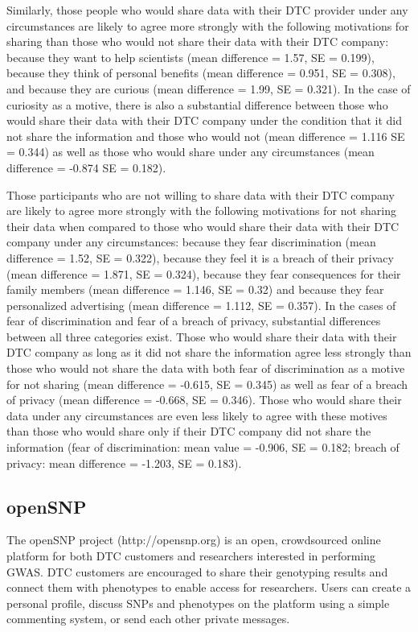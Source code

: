 \documentclass[10pt]{article}
\begin{document}
Similarly, those people who would share data with their DTC provider under any circumstances are likely to agree more strongly with 
the following motivations for sharing than those who would not share their data with their DTC company: because they want to help 
scientists (mean difference = 1.57, SE = 0.199), because they think of personal benefits (mean difference = 0.951, SE = 0.308), 
and because they are curious (mean difference = 1.99, SE = 0.321). In the case of curiosity as a motive, there is also a substantial difference between those who would share their data with their DTC company under the condition that it did not share the information and those who would not (mean difference = 1.116 SE = 0.344) as well as those who would share under any circumstances (mean difference = -0.874 SE = 0.182).

Those participants who are not willing to share data with their DTC company are likely to agree more strongly with the following motivations 
for not sharing their data when compared to those who would share their data with their DTC company under any circumstances: because they 
fear discrimination (mean difference = 1.52, SE = 0.322), because they feel it is a breach of their privacy (mean difference = 1.871, SE = 0.324), 
because they fear consequences for their family members (mean difference = 1.146, SE = 0.32) and because they fear personalized advertising (mean difference =  1.112, SE = 0.357). In the cases of fear of discrimination and fear of a breach of privacy, substantial differences between all three categories exist. Those who would share their data with their DTC company as long as it did not share the information agree less strongly than those who would not share the data with both fear of discrimination as a motive for not sharing (mean difference = -0.615, SE = 0.345) as well as fear of a breach of privacy (mean difference = -0.668, SE = 0.346). Those who would share their data under any circumstances are even less likely to agree with these motives than those who would share only if their DTC company did not share the information (fear of discrimination: mean value = -0.906, SE = 0.182; breach of privacy: mean difference = -1.203, SE = 0.183).

\subsection*{openSNP}

The openSNP project (http://opensnp.org) is an open, crowdsourced online platform for both DTC customers and researchers interested in performing GWAS. 
DTC customers are encouraged to share their genotyping results and connect them with phenotypes to enable access for researchers.
Users can create a personal profile, discuss SNPs and phenotypes on the 
platform using a simple commenting system, or send each other private messages. 
\end{document}
